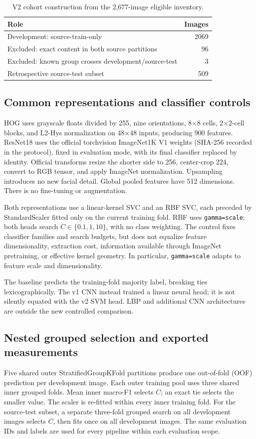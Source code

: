 \documentclass[11pt,a4paper]{article}
\begin{document}
\begin{table}[ht]
\centering
\caption{V2 cohort construction from the 2,677-image eligible inventory.}
\begin{tabular}{lr}\toprule
Role & Images \\\midrule
Development: source-train-only & 2069 \\
Excluded: exact content in both source partitions & 96 \\
Excluded: known group crosses development/source-test & 3 \\
Retrospective source-test subset & 509 \\\bottomrule
\end{tabular}
\end{table}

\subsection{Common representations and classifier controls}
HOG uses grayscale floats divided by 255, nine orientations, 8$\times$8 cells,
2$\times$2-cell blocks, and L2-Hys normalization on 48$\times$48 inputs, producing
900 features. ResNet18 uses the official torchvision ImageNet1K V1 weights
(SHA-256 recorded in the protocol), fixed in evaluation mode, with its final
classifier replaced by identity. Official transforms resize the shorter side
to 256, center-crop 224, convert to RGB tensor, and apply ImageNet normalization.
Upsampling introduces no new facial detail. Global pooled features have 512
dimensions. There is no fine-tuning or augmentation.

Both representations use a linear-kernel SVC and an RBF SVC, each preceded by
StandardScaler fitted only on the current training fold. RBF uses
\texttt{gamma=scale}; both heads search $C\in\{0.1,1,10\}$, with no class
weighting. The control fixes classifier families and search budgets, but does
not equalize feature dimensionality, extraction cost, information available
through ImageNet pretraining, or effective kernel geometry. In particular,
\texttt{gamma=scale} adapts to feature scale and dimensionality.

The baseline predicts the training-fold majority label, breaking ties
lexicographically. The v1 CNN instead trained a linear neural head; it is not
silently equated with the v2 SVM head. LBP and additional CNN architectures are
outside the new controlled comparison.

\subsection{Nested grouped selection and exported measurements}
Five shared outer StratifiedGroupKFold partitions produce one out-of-fold (OOF)
prediction per development image. Each outer training pool uses three shared
inner grouped folds. Mean inner macro-F1 selects $C$; an exact tie selects the
smaller value. The scaler is re-fitted within every inner training fold. For the
source-test subset, a separate three-fold grouped search on all development
images selects $C$, then fits once on all development images. The same evaluation
IDs and labels are used for every pipeline within each evaluation scope.
\end{document}
